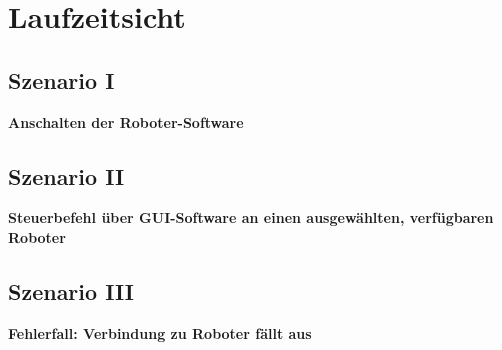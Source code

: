 \chapter{Laufzeitsicht}

\section{Szenario I}
\textbf{Anschalten der Roboter-Software}\\

\begin{figure}[h]
    \centering
    \label{fig:Anschalten}
\end{figure}

\clearpage
\section{Szenario II}
\textbf{Steuerbefehl über GUI-Software an einen ausgewählten, verfügbaren Roboter}\\

\begin{figure}[h]  
    \centering
    \label{fig:Steuerbefehl}
\end{figure}

\clearpage
\section{Szenario III}
\textbf{Fehlerfall: Verbindung zu Roboter fällt aus}\\

\begin{figure}[h]  
    \centering
    \label{fig:Fehlerfall}
\end{figure}




